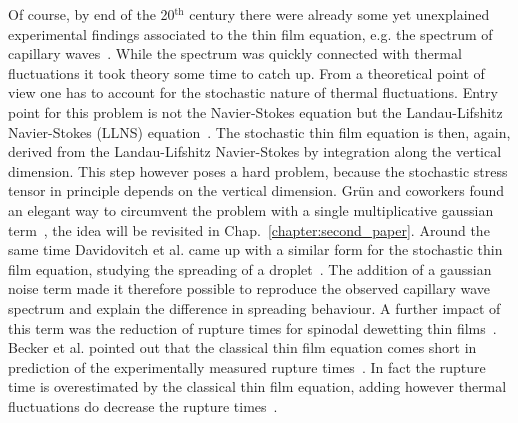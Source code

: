 Of course, by end of the 20$^{\text{th}}$ century there were already some yet unexplained experimental findings associated to the thin film equation, e.g. the spectrum of capillary waves~\cite{doi:10.1021/ja01014a015}.
While the spectrum was quickly connected with thermal fluctuations it took theory some time to catch up.
From a theoretical point of view one has to account for the stochastic nature of thermal fluctuations.
Entry point for this problem is not the Navier-Stokes equation but the Landau-Lifshitz Navier-Stokes (LLNS) equation~\cite{Landau1987Fluid}.
The stochastic thin film equation is then, again, derived from the Landau-Lifshitz Navier-Stokes by integration along the vertical dimension.
This step however poses a hard problem, because the stochastic stress tensor in principle depends on the vertical dimension.
Grün and coworkers found an elegant way to circumvent the problem with a single multiplicative gaussian term~\cite{Grun2006, Mecke_2005, PhysRevLett.99.114503, PhysRevE.102.053105, PhysRevE.100.023108, PhysRevE.92.061002}, the idea will be revisited in Chap.~\ref{chapter:second_paper}.
Around the same time Davidovitch et al. came up with a similar form for the stochastic thin film equation, studying the spreading of a droplet~\cite{PhysRevLett.95.244505}.
The addition of a gaussian noise term made it therefore possible to reproduce the observed capillary wave spectrum and explain the difference in spreading behaviour.
A further impact of this term was the reduction of rupture times for spinodal dewetting thin films~\cite{Grun2006, PhysRevLett.99.114503}.
Becker et al. pointed out that the classical thin film equation comes short in prediction of the experimentally measured rupture times~\cite{becker2003complex}.
In fact the rupture time is overestimated by the classical thin film equation, adding however thermal fluctuations do decrease the rupture times~\cite{Duran_Olivencia2019, shah_van_steijn_kleijn_kreutzer_2019}.

